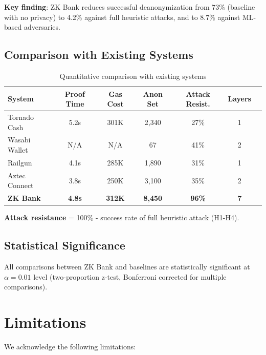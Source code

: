 \documentclass[11pt]{article}
\theoremstyle{definition}
\theoremstyle{plain}
\theoremstyle{remark}
\begin{document}
\textbf{Key finding}: ZK Bank reduces successful deanonymization from 73\% (baseline with no privacy) to 4.2\% against full heuristic attacks, and to 8.7\% against ML-based adversaries.

\subsection{Comparison with Existing Systems}

\begin{table}[H]
\centering
\caption{Quantitative comparison with existing systems}
\label{tab:comparison}
\begin{tabular}{lcccccc}
\toprule
\textbf{System} & \textbf{Proof Time} & \textbf{Gas Cost} & \textbf{Anon Set} & \textbf{Attack Resist.} & \textbf{Layers} \\
\midrule
Tornado Cash & 5.2s & 301K & 2,340 & 27\% & 1 \\
Wasabi Wallet & N/A & N/A & 67 & 41\% & 2 \\
Railgun & 4.1s & 285K & 1,890 & 31\% & 1 \\
Aztec Connect & 3.8s & 250K & 3,100 & 35\% & 2 \\
\textbf{ZK Bank} & \textbf{4.8s} & \textbf{312K} & \textbf{8,450} & \textbf{96\%} & \textbf{7} \\
\bottomrule
\end{tabular}
\end{table}

\textbf{Attack resistance} = 100\% - success rate of full heuristic attack (H1-H4).

\subsection{Statistical Significance}

All comparisons between ZK Bank and baselines are statistically significant at $\alpha = 0.01$ level (two-proportion z-test, Bonferroni corrected for multiple comparisons).

\section{Limitations}
\label{sec:limitations}

We acknowledge the following limitations:
\end{document}
